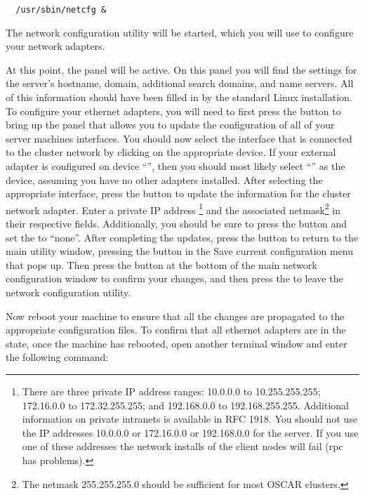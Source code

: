 \begin{verbatim}
  /usr/sbin/netcfg &
\end{verbatim}
  
The network configuration utility will be started, which you will use
to configure your network adapters.
  
At this point, the  panel will be active. On this panel
you will find the settings for the server's hostname, domain,
additional search domains, and name servers. All of this information
should have been filled in by the standard Linux installation. To
configure your ethernet adapters, you will need to first press the
 button to bring up the panel that allows you to
update the configuration of all of your server machines interfaces.
You should now select the interface that is connected to the cluster
network by clicking on the appropriate device. If your external
adapter is configured on device ``'', then you should most
likely select ``'' as the device, assuming you have no
other adapters installed. After selecting the appropriate interface,
press the  button to update the information for the
cluster network adapter. Enter a private IP address
\begchange
\footnote
{
  There are
  three private IP address ranges: 10.0.0.0 to 10.255.255.255;
  172.16.0.0 to 172.32.255.255; and 192.168.0.0 to 192.168.255.255.
  Additional information on private intranets is available in RFC
  1918.
  You should not use the IP addresses 10.0.0.0 or 172.16.0.0 or 
  192.168.0.0 for the server.  If you use one of these addresses 
  the network installs of the client nodes will fail (rpc has 
  problems).
}
\endchange
and the associated netmask\footnote{The netmask
  255.255.255.0 should be sufficient for most OSCAR clusters.}  in
their respective fields. Additionally, you should be sure to press the
 button and set the
 to ``none''.  After
completing the updates, press the  button to return to
the main utility window,
\begchange
pressing the  button in the Save current configuration
menu that pops up.
\endchange
Then press the  button at the bottom of the main network
configuration window to confirm your changes, and then press the
 to leave the network configuration utility.
  
Now reboot your machine to ensure that all the changes are propagated
to the appropriate configuration files. To confirm that all ethernet
adapters are in the  state, once the machine has rebooted,
open another terminal window and enter the following command:

